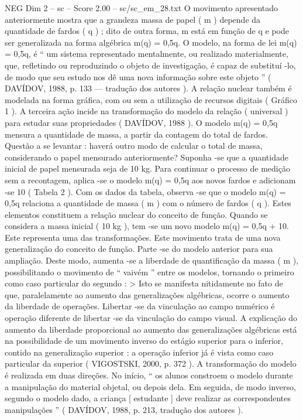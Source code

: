 \begin{textsample}{NEG Dim 2 – sc – Score 2.00 – sc/sc\_em\_28.txt}
O movimento apresentado anteriormente mostra que a grandeza massa de papel ( m ) depende da quantidade de fardos ( q ) ; dito de outra forma, m está em função de q e pode ser generalizada na forma algébrica m(q) = 0,5q.
O modelo, na forma de lei m(q) = 0,5q, é “ um sistema representado mentalmente, ou realizado materialmente, que, refletindo ou reproduzindo o objeto de investigação, é capaz de substituí -lo, de modo que seu estudo nos dê uma nova informação sobre este objeto ” ( DAVÍDOV, 1988, p. 133 — tradução dos autores ).
A relação nuclear também é modelada na forma gráfica, com ou sem a utilização de recursos digitais ( Gráfico 1 ).
A terceira ação incide na transformação do modelo da relação ( universal ) para estudar suas propriedades ( DAVÍDOV, 1988 ).
O modelo m(q) = 0,5q mensura a quantidade de massa, a partir da contagem do total de fardos.
Questão a se levantar : haverá outro modo de calcular o total de massa, considerando o papel mensurado anteriormente?
Suponha -se que a quantidade inicial de papel mensurada seja de 10 kg.
Para continuar o processo de medição sem a recontagem, aplica -se o modelo m(q) = 0,5q aos novos fardos e adicionam -se 10 ( Tabela 2 ).
Com os dados da tabela, observa -se que o modelo m(q) = 0,5q relaciona a quantidade de massa ( m ) com o número de fardos ( q ).
Estes elementos constituem a relação nuclear do conceito de função.
Quando se considera a massa inicial ( 10 kg ), tem -se um novo modelo m(q) = 0,5q + 10.
Este representa uma das transformações.
Este movimento trata de uma nova generalização do conceito de função.
Parte -se do modelo anterior para sua ampliação.
Deste modo, aumenta -se a liberdade de quantificação da massa ( m ), possibilitando o movimento de “ vaivém ” entre os modelos, tornando o primeiro como caso particular do segundo : > Isto se manifesta nitidamente no fato de que, paralelamente ao aumento das generalizações algébricas, ocorre o aumento da liberdade de operações.
Libertar -se da vinculação ao campo numérico é operação diferente de libertar -se da vinculação do campo visual.
A explicação do aumento da liberdade proporcional ao aumento das generalizações algébricas está na possibilidade de um movimento inverso do estágio superior para o inferior, contido na generalização superior : a operação inferior já é vista como caso particular da superior ( VIGOSTSKI, 2000, p. 372 ).
A transformação do modelo é realizada em duas direções.
No início, “ os alunos constroem o modelo durante a manipulação do material objetal, ou depois dela.
Em seguida, de modo inverso, segundo o modelo dado, a criança [ estudante ] deve realizar as correspondentes manipulações ” ( DAVÍDOV, 1988, p. 213, tradução dos autores ).

\end{textsample}
